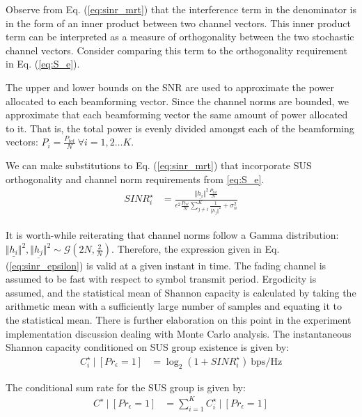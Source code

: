  Observe from Eq. (\ref{eq:sinr_mrt}) that the interference term in the denominator is in the form of an inner product between two channel vectors. This inner product term can be interpreted as a measure of orthogonality between the two stochastic channel vectors. Consider comparing this term to the orthogonality requirement in Eq. (\ref{eq:S_e}).

The upper and lower bounds on the SNR are used to approximate the power allocated to each beamforming vector. Since the channel norms are bounded, we approximate that each beamforming vector the same amount of power allocated to it. That is, the total power is evenly divided amongst each of the beamforming vectors: $P_i = \frac{P_{tot}}{N}\ \forall i=1,2\ldots K$.

We can make substitutions to Eq. (\ref{eq:sinr_mrt}) that incorporate SUS orthogonality and channel norm requirements from \ref{eq:S_e}.
\begin{equation}\label{eq:sinr_epsilon}
    \begin{aligned}
        SINR_i^{\star} &=  \frac{\Vert \underline{h_i}\Vert^2 \frac{P_{tot}}{N}} {\epsilon^2 \frac{P_{tot}}{N} \sum_{j \neq i}^K  \frac{1}{\Vert \underline{h_j}\Vert^2} + \sigma_n^2}
    \end{aligned}
\end{equation}

It is worth-while reiterating that channel norms follow a Gamma distribution: $\Vert \underline{h_i} \Vert^2 , \Vert \underline{h_j} \Vert^2 \sim \mathcal{G}(2N,\frac{2}{N})$. Therefore, the expression given in Eq. (\ref{eq:sinr_epsilon}) is valid at a given instant in time. The fading channel is assumed to be fast with respect to symbol transmit period. Ergodicity is assumed, and the statistical mean of Shannon capacity is calculated by taking the arithmetic mean with a sufficiently large number of samples and equating it to the statistical mean. There is further elaboration on this point in the experiment implementation discussion dealing with Monte Carlo analysis. The instantaneous Shannon capacity conditioned on SUS group existence is given by:
\begin{equation}\label{eq:capacity}
    \begin{aligned}
        C_i^{\star} \ \vert \ [Pr_\epsilon = 1] &= \log_2(1 + SINR_i^{\star})\ \text{bps/Hz}
    \end{aligned}
\end{equation}

The conditional sum rate for the SUS group is given by:
\begin{equation}\label{eq:sum_rate_conditional}
    \begin{aligned}
        C^{\star} \ \vert \ [Pr_\epsilon = 1] &= \sum_{i=1}^K C_i^{\star}  \ \vert \ [Pr_\epsilon = 1]
    \end{aligned}
\end{equation}

